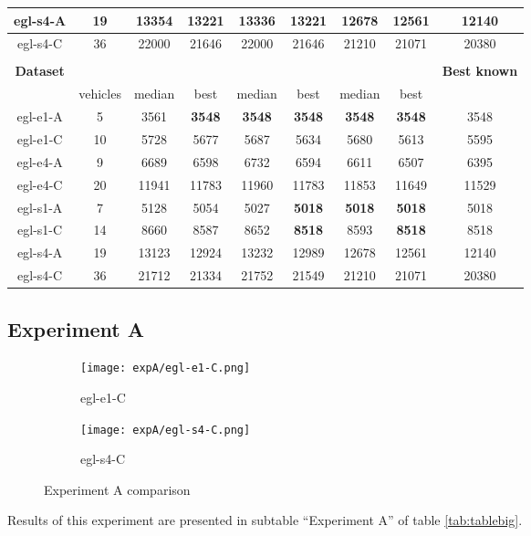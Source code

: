 \documentclass[twoside]{ctuthesis}
\theoremstyle{plain}
\theoremstyle{definition}
\theoremstyle{note}
\begin{document}
\begin{table}[htbp]
\begin{tabular}{|c|c|cc|cc|cc|c|}
		egl-s4-A &19&13354&13221&13336&13221&12678&12561&12140\\ \hline
		egl-s4-C &36&22000&21646&22000&21646&21210&21071&20380\\ \hhline{|=========|}
		\multicolumn{9}{|c|}{\textbf{Experiment C}}\\ 
		\multicolumn{1}{|c}{\textbf{Dataset}}&\multicolumn{1}{c}{}&\multicolumn{2}{c}{\textbf{\nnsrbasic200}}&\multicolumn{2}{c}{\textbf{\nnsrnode200}}&\multicolumn{2}{c}{\textbf{\nnsredge}}&\textbf{Best known} \\ \hline
		&vehicles&median&best&median&best&median&best&\\ \hline
		egl-e1-A&5&3561&\textbf{3548}&\textbf{3548}&\textbf{3548}&\textbf{3548}&\textbf{3548}&3548\\ \hline
		egl-e1-C&10&5728&5677&5687&5634&5680&5613&5595\\ \hline
		egl-e4-A&9&6689&6598&6732&6594&6611&6507&6395\\ \hline
		egl-e4-C&20&11941&11783&11960&11783&11853&11649&11529\\ \hline
		egl-s1-A&7&5128&5054&5027&\textbf{5018}&\textbf{5018}&\textbf{5018}&5018\\ \hline
		egl-s1-C&14&8660&8587&8652&\textbf{8518}&8593&\textbf{8518}&8518\\ \hline
		egl-s4-A&19&13123&12924&13232&12989&12678&12561&12140\\ \hline
		egl-s4-C&36&21712&21334&21752&21549&21210&21071&20380\\ \hline
	\end{tabular}
\end{table}

\subsection{Experiment A}
\label{exp:expA}

\begin{figure}[htbp]
	\label{fig:expasub}
	\centering
	\begin{subfigure}{0.49\textwidth}
		\centering
		\texttt{[image: expA/egl-e1-C.png]}
		\caption{egl-e1-C}
		\label{fig:subfig1}
	\end{subfigure}
	\hfill
	\begin{subfigure}{0.49\textwidth}
		\centering
		\texttt{[image: expA/egl-s4-C.png]}
		\caption{egl-s4-C}
		\label{fig:subfig2}
	\end{subfigure}
	\caption{Experiment A comparison}
\end{figure}
Results of this experiment are presented in subtable ``Experiment A'' of table \ref{tab:tablebig}. 
\end{document}
